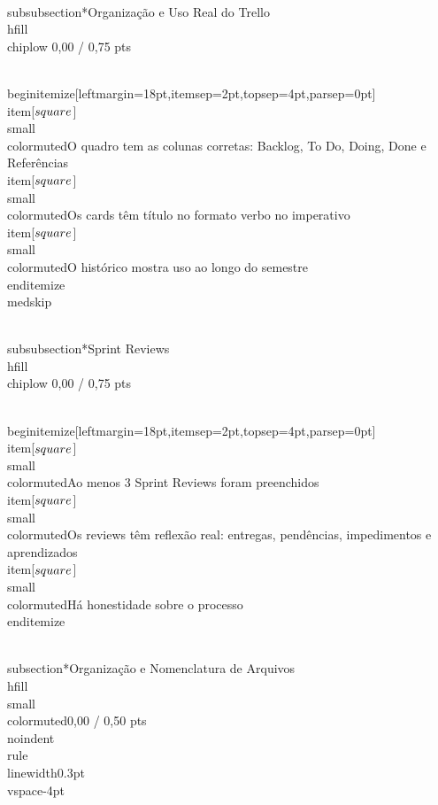 \documentclass[11pt, a4paper]{article}
\newcommand{\chiplow}[1]{\colorbox{crimsondim}{\color{crimson}\semibold\small\strut\ #1\ }}
\begin{document}
\\subsubsection*{Organização e Uso Real do Trello \\hfill {\\chiplow 0,00 / 0,75 pts}}

\\begin{itemize}[leftmargin=18pt,itemsep=2pt,topsep=4pt,parsep=0pt]
  \\item[$\\square$] {\\small\\color{muted}O quadro tem as colunas corretas: Backlog, To Do, Doing, Done e Referências}
  \\item[$\\square$] {\\small\\color{muted}Os cards têm título no formato verbo no imperativo}
  \\item[$\\square$] {\\small\\color{muted}O histórico mostra uso ao longo do semestre}
\\end{itemize}
\\medskip

\\subsubsection*{Sprint Reviews \\hfill {\\chiplow 0,00 / 0,75 pts}}

\\begin{itemize}[leftmargin=18pt,itemsep=2pt,topsep=4pt,parsep=0pt]
  \\item[$\\square$] {\\small\\color{muted}Ao menos 3 Sprint Reviews foram preenchidos}
  \\item[$\\square$] {\\small\\color{muted}Os reviews têm reflexão real: entregas, pendências, impedimentos e aprendizados}
  \\item[$\\square$] {\\small\\color{muted}Há honestidade sobre o processo}
\\end{itemize}

\\subsection*{Organização e Nomenclatura de Arquivos \\hfill {\\small\\color{muted}0,00 / 0,50 pts}}
\\noindent\\rule{\\linewidth}{0.3pt}\\vspace{-4pt}
\end{document}
